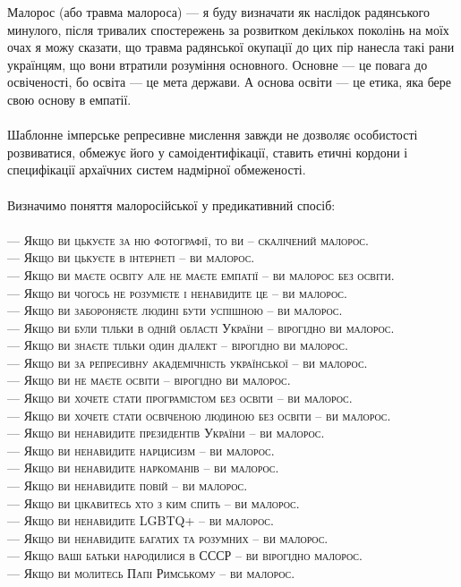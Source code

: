 Малорос (або травма малороса) --- я буду визначати як наслідок
радянського минулого, після тривалих спостережень за розвитком
декількох поколінь на моїх очах я можу сказати, що травма радянської
окупації до цих пір нанесла такі рани українцям, що вони втратили
розуміння основного. Основне — це повага до освіченості,
бо освіта --- це мета держави. А основа освіти --- це етика, яка бере свою основу в емпатії.
\\
\\
Шаблонне імперське репресивне мислення завжди не дозволяє
особистості розвиватися, обмежує його у самоідентифікації,
ставить етичні кордони і специфікації архаїчних систем надмірної обмеженості.
\\
\\
Визначимо поняття малоросійської у предикативний спосіб:
\\
\\
\textsc{\small
--- Якщо ви цькуєте за ню фотографії, то ви -- скалічений малорос.\\
--- Якщо ви цькуєте в інтернеті -- ви малорос.\\
--- Якщо ви маєте освіту але не маєте емпатії -- ви малорос без освіти.\\
--- Якщо ви чогось не розумієте і ненавидите це -- ви малорос.\\
--- Якщо ви забороняєте людині бути успішною -- ви малорос.\\
--- Якщо ви були тільки в одній області України -- вірогідно ви малорос.\\
--- Якщо ви знаєте тільки один діалект -- вірогідно ви малорос.\\
--- Якщо ви за репресивну академічність української -- ви малорос.\\
--- Якщо ви не маєте освіти -- вірогідно ви малорос.\\
--- Якщо ви хочете стати програмістом без освіти -- ви малорос.\\
--- Якщо ви хочете стати освіченою людиною без освіти -- ви малорос.\\
--- Якщо ви ненавидите президентів України -- ви малорос.\\
--- Якщо ви ненавидите нарцисизм -- ви малорос.\\
--- Якщо ви ненавидите наркоманів -- ви малорос.\\
--- Якщо ви ненавидите повій -- ви малорос.\\
--- Якщо ви цікавитесь хто з ким спить -- ви малорос.\\
--- Якщо ви ненавидите LGBTQ+ -- ви малорос.\\
--- Якщо ви ненавидите багатих та розумних -- ви малорос.\\
--- Якщо ваші батьки народилися в СССР -- ви вірогідно малорос.\\
--- Якщо ви молитесь Папі Римському -- ви малорос.\\
}
